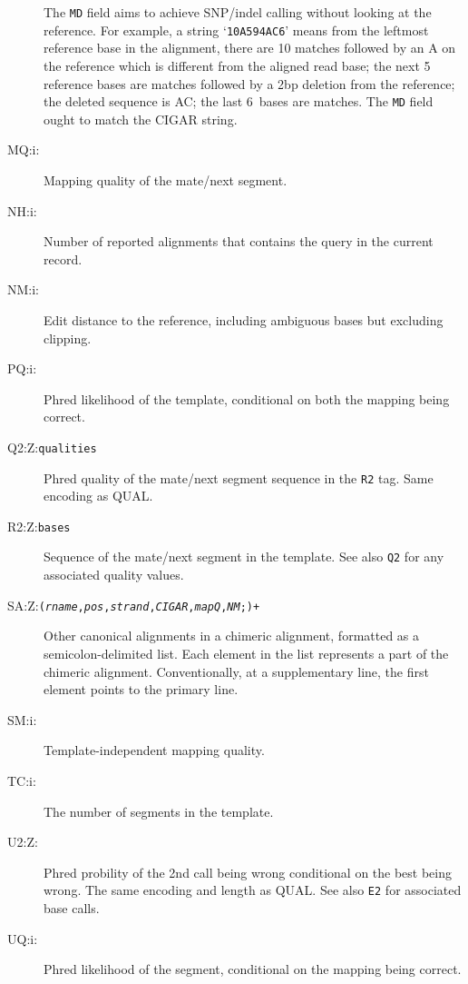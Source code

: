 \documentclass[10pt]{article}
\newcommand{\tagvalue}[1]{\tt #1}
\newcommand{\tagregex}[1]{\tt #1}
\begin{document}
\begin{description}
The {\tt MD} field aims to achieve SNP/indel calling without
looking at the reference. For example, a string `{\tt 10A5\char94AC6}' means
from the leftmost reference base in the alignment, there are 10 matches
followed by an A on the reference which is different from the aligned read
base; the next 5 reference bases are matches followed by a 2bp deletion from
the reference; the deleted sequence is AC; the last 6~bases are matches.
The {\tt MD} field ought to match the {\sf CIGAR} string.

\item[MQ:i:\tagvalue{}]
Mapping quality of the mate/next segment.

\item[NH:i:\tagvalue{}]
Number of reported alignments that contains the query in the current record.

\item[NM:i:\tagvalue{}]
Edit distance to the reference, including ambiguous bases but excluding clipping.

\item[PQ:i:\tagvalue{}]
Phred likelihood of the template, conditional on both the mapping being correct.

\item[Q2:Z:\tagvalue{qualities}]
Phred quality of the mate/next segment sequence in the {\tt R2} tag.
Same encoding as {\sf QUAL}.

\item[R2:Z:\tagvalue{bases}]
Sequence of the mate/next segment in the template.  See also {\tt Q2}
for any associated quality values.

\item[SA:Z:\tagregex{{\tt (}\emph{rname}{\tt ,}\emph{pos}{\tt ,}\emph{strand}{\tt ,}\emph{CIGAR}{\tt ,}\emph{mapQ}{\tt ,}\emph{NM}{\tt ;)}+}]
Other canonical alignments in a chimeric alignment, formatted as a semicolon-delimited list.
Each element in the list represents a part of the chimeric alignment. Conventionally, at a supplementary line, the first element points to the primary line.

\item[SM:i:\tagvalue{}]
Template-independent mapping quality.

\item[TC:i:\tagvalue{}]
The number of segments in the template.

\item[U2:Z:\tagvalue{}]
Phred probility of the 2nd call being wrong conditional on the best being wrong.
The same encoding and length as {\sf QUAL}.  See also {\tt E2} for associated base calls.

\item[UQ:i:\tagvalue{}]
Phred likelihood of the segment, conditional on the mapping being correct.
\end{description}
\end{document}
